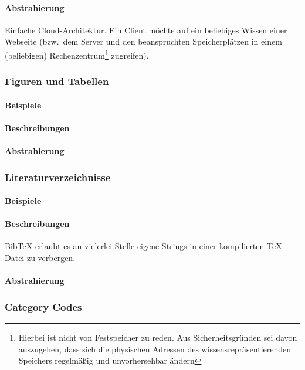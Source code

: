 \paragraph*{Abstrahierung}
Einfache Cloud-Architektur. Ein Client möchte auf ein beliebiges Wissen einer Webseite (bzw.\ dem Server und den beanspruchten Speicherplätzen in einem (beliebigen) Rechenzentrum\footnote{Hierbei ist nicht von Festspeicher zu reden. Aus Sicherheitsgründen sei davon auszugehen, dass sich die physischen Adressen des wissensrepräsentierenden Speichers regelmäßig und unvorhersehbar ändern} zugreifen).




\subsubsection{Figuren und Tabellen}\label{problems:advanced:tables}
\paragraph*{Beispiele}
\paragraph*{Beschreibungen}
\paragraph*{Abstrahierung}

\subsubsection{Literaturverzeichnisse}\label{problems:advanced:bibtex}
\paragraph*{Beispiele}
\paragraph*{Beschreibungen}
Bib\TeX{} erlaubt es an vielerlei Stelle eigene Strings in einer kompilierten \TeX{}-Datei zu verbergen.
\paragraph*{Abstrahierung}


\subsubsection{Category Codes}\label{problems:advanced:catcode}
